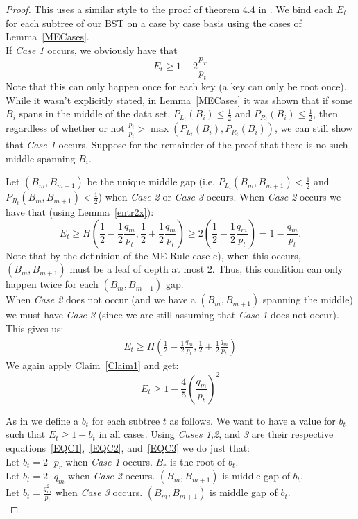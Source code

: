 \documentclass[letterpaper,12pt,titlepage,oneside,final]{book}
\theoremstyle{plain}
\begin{document}
\begin{proof}
This uses a similar style to the proof of theorem 4.4 in \cite{bayer1975improved}.
We bind each $E_t$ for each subtree of our BST on a case by case basis using the cases of Lemma~\ref{MECases}.\\
If \textit{Case 1} occurs, we obviously have that
\begin{equation}\label{EQC1}
E_t \geq 1-2 \frac{p_r}{p_t}
\end{equation}
Note that this can only happen once for each key (a key can only be root once). \\

While it wasn't explicitly stated, in Lemma~\ref{MECases} it was shown that if some $B_i$ spans in the middle of the data set, $P_{L_t}(B_i) \leq \frac{1}{2}$ and $P_{R_t}(B_i) \leq \frac{1}{2}$, then regardless of whether or not $\frac{p_i}{p_t} > \max(P_{L_t}(B_i), P_{R_t}(B_i))$, we can still show that \textit{Case 1} occurs. Suppose for the remainder of the proof that there is no such middle-spanning $B_i$.

Let $(B_m, B_{m+1})$ be the unique middle gap (i.e. $P_{L_t}(B_m, B_{m+1}) < \frac{1}{2}$ and $P_{R_t}(B_m, B_{m+1}) < \frac{1}{2}$) when \textit{Case 2} or \textit{Case 3} occurs. When \textit{Case 2} occurs we have that (using Lemma~\ref{entr2x}):
\begin{equation}\label{EQC2} 
E_t \geq H(\frac{1}{2}-\frac{1}{2} \frac{q_m}{p_t}, \frac{1}{2} + \frac{1}{2} \frac{q_m}{p_t}) \geq 2(\frac{1}{2}-\frac{1}{2} \frac{q_m}{p_t})=1-\frac{q_m}{p_t}.
\end{equation}
Note that by the definition of the ME Rule case c), when this occurs, $(B_m, B_{m+1})$ must be a leaf of depth at most 2. Thus, this condition can only happen twice for each $(B_m, B_{m+1})$ gap. \\

When \textit{Case 2} does not occur (and we have a $(B_m, B_{m+1})$ spanning the middle) we must have \textit{Case 3} (since we are still assuming that \textit{Case 1} does not occur). This gives us:
\begin{align*}
E_t \geq H(\frac{1}{2}-\frac{1}{2} \frac{q_m}{p_t}, \frac{1}{2} + \frac{1}{2} \frac{q_m}{p_t})
\end{align*}
We again apply Claim~\ref{Claim1} and get:
\begin{equation}\label{EQC3}
E_t \geq 1- \frac{4}{5} (\frac{q_m}{p_t})^2
\end{equation}

As in \cite{bayer1975improved} we define a $b_t$ for each subtree $t$ as follows. We want to have a value for $b_t$ such that $E_t \geq 1 - b_t$ in all cases. Using \textit{Cases 1,2}, and \textit{3} are their respective equations~\ref{EQC1},~\ref{EQC2}, and~\ref{EQC3} we do just that: \\
Let $b_t=2\cdot p_r$ when \textit{Case 1} occurs. $B_r$ is the root of $b_t$. \\
Let $b_t=2\cdot q_m$ when \textit{Case 2} occurs. $(B_m, B_{m+1})$ is middle gap of $b_t$. \\
Let $b_t=\frac{q_m^2}{p_t}$ when \textit{Case 3} occurs. $(B_m, B_{m+1})$ is middle gap of $b_t$. \\



\end{proof}
\end{document}
